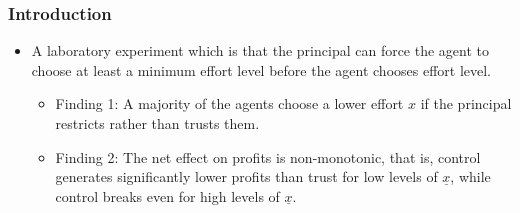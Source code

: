\documentclass[unicode,12pt]{beamer}
\begin{document}
    \begin{frame}
        \frametitle{Introduction}
    
        \begin{itemize}
            \item A laboratory experiment which is that the principal can force the agent to choose at least a minimum effort level before the agent chooses effort level.
            \begin{itemize}
                \item Finding 1: A majority of the agents choose a lower effort $x$ if the principal restricts rather than trusts them.
                \item Finding 2: The net effect on profits is non-monotonic, that is, control generates significantly lower profits than trust for low levels of $\underline{x}$, while control breaks even for high levels of $\underline{x}$. 
            \end{itemize}
        \end{itemize}
    
    \end{frame}
\end{document}
